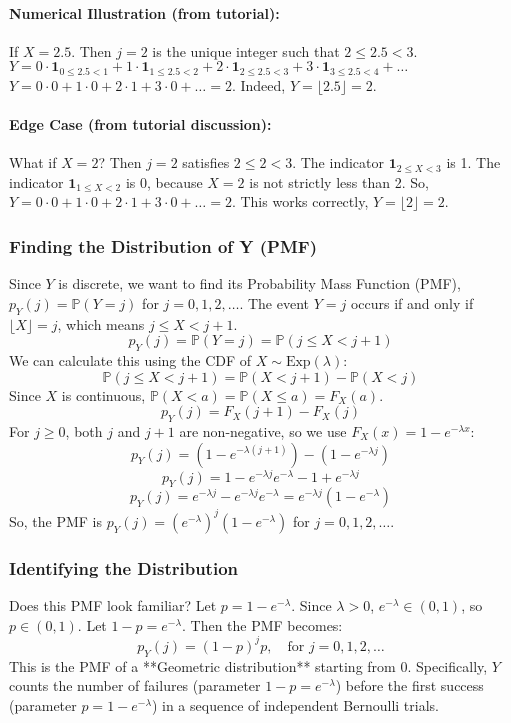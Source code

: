 \documentclass[11pt]{article}
\theoremstyle{mytheoremstyle}
\theoremstyle{mydefinitionstyle}
\newcommand{\indicator}[1]{\mathbf{1}_{#1}}
\newcommand{\Prob}{\mathbb{P}} %
\begin{document}
\paragraph{Numerical Illustration (from tutorial):} If $X=2.5$.
Then $j=2$ is the unique integer such that $2 \le 2.5 < 3$.
$Y = 0 \cdot \indicator{0 \le 2.5 < 1} + 1 \cdot \indicator{1 \le 2.5 < 2} + 2 \cdot \indicator{2 \le 2.5 < 3} + 3 \cdot \indicator{3 \le 2.5 < 4} + \dots$
$Y = 0 \cdot 0 + 1 \cdot 0 + 2 \cdot 1 + 3 \cdot 0 + \dots = 2$.
Indeed, $Y = \lfloor 2.5 \rfloor = 2$.

\paragraph{Edge Case (from tutorial discussion):} What if $X=2$?
Then $j=2$ satisfies $2 \le 2 < 3$. The indicator $\indicator{2 \le X < 3}$ is 1.
The indicator $\indicator{1 \le X < 2}$ is 0, because $X=2$ is not strictly less than 2.
So, $Y = 0 \cdot 0 + 1 \cdot 0 + 2 \cdot 1 + 3 \cdot 0 + \dots = 2$. This works correctly, $Y = \lfloor 2 \rfloor = 2$.

\subsubsection{Finding the Distribution of Y (PMF)}
Since $Y$ is discrete, we want to find its Probability Mass Function (PMF), $p_Y(j) = \Prob(Y=j)$ for $j = 0, 1, 2, \dots$.
The event $Y=j$ occurs if and only if $\lfloor X \rfloor = j$, which means $j \le X < j+1$.
\[ p_Y(j) = \Prob(Y=j) = \Prob(j \le X < j+1) \]
We can calculate this using the CDF of $X \sim \text{Exp}(\lambda)$:
\[ \Prob(j \le X < j+1) = \Prob(X < j+1) - \Prob(X < j) \]
Since $X$ is continuous, $\Prob(X < a) = \Prob(X \le a) = F_X(a)$.
\[ p_Y(j) = F_X(j+1) - F_X(j) \]
For $j \ge 0$, both $j$ and $j+1$ are non-negative, so we use $F_X(x) = 1 - e^{-\lambda x}$:
\[ p_Y(j) = (1 - e^{-\lambda(j+1)}) - (1 - e^{-\lambda j}) \]
\[ p_Y(j) = 1 - e^{-\lambda j} e^{-\lambda} - 1 + e^{-\lambda j} \]
\[ p_Y(j) = e^{-\lambda j} - e^{-\lambda j} e^{-\lambda} = e^{-\lambda j} (1 - e^{-\lambda}) \]
So, the PMF is $p_Y(j) = (e^{-\lambda})^j (1 - e^{-\lambda})$ for $j=0, 1, 2, \dots$.

\subsubsection{Identifying the Distribution}
Does this PMF look familiar? Let $p = 1 - e^{-\lambda}$. Since $\lambda > 0$, $e^{-\lambda} \in (0, 1)$, so $p \in (0, 1)$.
Let $1-p = e^{-\lambda}$. Then the PMF becomes:
\[ p_Y(j) = (1-p)^j p, \quad \text{for } j=0, 1, 2, \dots \]
This is the PMF of a **Geometric distribution** starting from 0. Specifically, $Y$ counts the number of failures (parameter $1-p = e^{-\lambda}$) before the first success (parameter $p = 1 - e^{-\lambda}$) in a sequence of independent Bernoulli trials.
\end{document}
